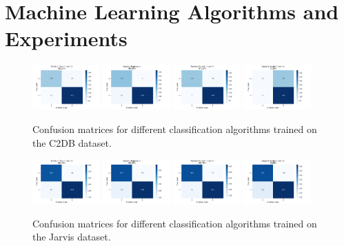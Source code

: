 \documentclass{article}
\begin{document}
\section{Machine Learning Algorithms and Experiments}
\label{sec:ml}

\begin{figure}
	\centering
	\includegraphics[width = 0.23\textwidth]{figures/c_dtc}
	\includegraphics[width = 0.23\textwidth]{figures/c_lr}
	\includegraphics[width = 0.23\textwidth]{figures/c_rfc}
	\includegraphics[width = 0.23\textwidth]{figures/c_svc}
	\caption{Confusion matrices for different classification algorithms trained on the C2DB dataset.}
	\label{fig:c}
\end{figure}

\begin{figure}
	\centering
	\includegraphics[width = 0.23\textwidth]{figures/j_dtc}
	\includegraphics[width = 0.23\textwidth]{figures/j_lr}
	\includegraphics[width = 0.23\textwidth]{figures/j_rfc}
	\includegraphics[width = 0.23\textwidth]{figures/j_svc}
	\caption{Confusion matrices for different classification algorithms trained on the Jarvis dataset.}
	\label{fig:j}
\end{figure}
\end{document}
